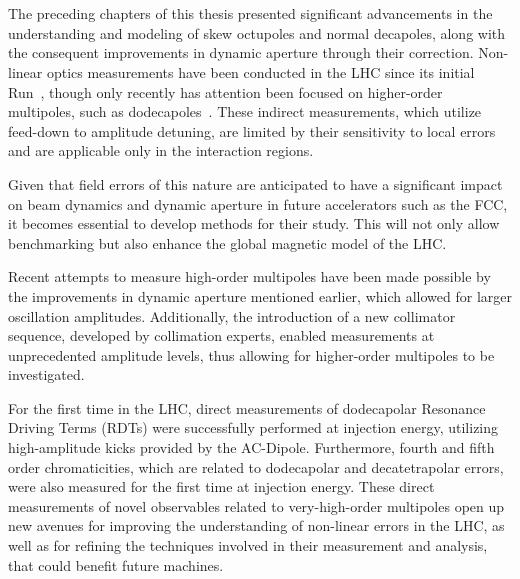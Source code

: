 \section{}

The preceding chapters of this thesis presented significant advancements in the understanding and
modeling of skew octupoles and normal decapoles, along with the consequent improvements in
dynamic aperture through their correction. Non-linear optics measurements have been conducted in the
LHC since its initial Run~\cite{maclean_non-linear_2011, maclean_commissioning_2016-1}, though only
recently has attention been focused on higher-order multipoles, such as
dodecapoles~\cite{dilly_joschua_corrections_nodate}. These indirect measurements, which utilize
feed-down to amplitude detuning, are limited by their sensitivity to local errors and are applicable
only in the interaction regions.

Given that field errors of this nature are anticipated to have a significant impact on beam dynamics
and dynamic aperture in future accelerators such as the FCC, it becomes essential to develop methods
for their study. This will not only allow benchmarking but also enhance the global magnetic
model of the LHC.

Recent attempts to measure high-order multipoles have been made possible by the improvements in
dynamic aperture mentioned earlier, which allowed for larger oscillation amplitudes. Additionally,
the introduction of a new collimator sequence, developed by collimation experts, enabled
measurements at unprecedented amplitude levels, thus allowing for higher-order multipoles to be
investigated.

For the first time in the LHC, direct measurements of dodecapolar Resonance Driving Terms (RDTs)
were successfully performed at injection energy, utilizing high-amplitude kicks provided by the
AC-Dipole. Furthermore, fourth and fifth order chromaticities, which are related to dodecapolar and
decatetrapolar errors, were also measured for the first time at injection energy. 
These direct measurements of novel observables related to very-high-order multipoles open up new
avenues for improving the understanding of non-linear errors in the LHC, as well as
for refining the techniques involved in their measurement and analysis, that could benefit future
machines.


